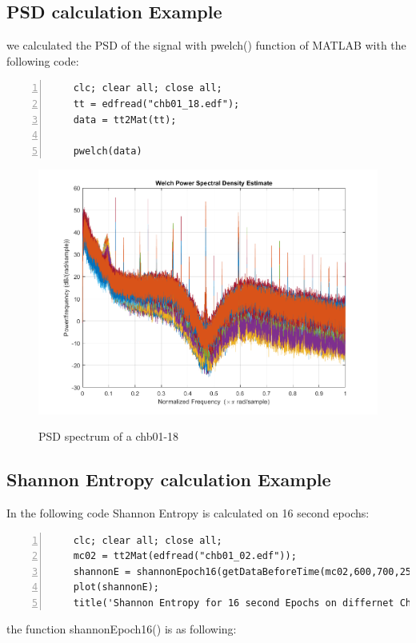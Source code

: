 \documentclass[11pt]{article}
\begin{document}
\subsection{PSD calculation Example}
we calculated the PSD of the signal with pwelch() function of MATLAB with the following code: \\
\begin{lstlisting}[backgroundcolor=\color{lbcolor}, frame=single,
    numbers=left,style=Matlab-editor]
    %% PSD example
    clc; clear all; close all;
    tt = edfread("chb01_18.edf");
    data = tt2Mat(tt);
    
    pwelch(data)
\end{lstlisting}

\begin{figure}[H]
    \begin{center}
        \includegraphics[scale=0.6]{Fig/PSDspect.png}
        \label{fig:PSDspectrum}
        \caption{PSD spectrum of a chb01-18}
    \end{center}
\end{figure}

\subsection{Shannon Entropy calculation Example}
In the following code Shannon Entropy is calculated on 16 second epochs: \\

\begin{lstlisting}[backgroundcolor=\color{lbcolor}, frame=single,
    numbers=left,style=Matlab-editor]
    %% shannon entropy
    clc; clear all; close all;
    mc02 = tt2Mat(edfread("chb01_02.edf"));
    shannonE = shannonEpoch16(getDataBeforeTime(mc02,600,700,256), 16, 256);
    plot(shannonE);
    title('Shannon Entropy for 16 second Epochs on differnet Channels');
\end{lstlisting}
the function shannonEpoch16() is as following: \\
\end{document}
